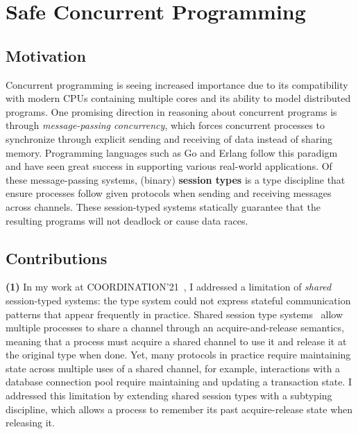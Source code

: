 \documentclass[11pt]{article}
\begin{document}
\section*{Safe Concurrent Programming}
\subsection*{Motivation}
Concurrent programming is seeing increased importance due to its
compatibility with modern CPUs containing multiple cores and its ability to model
distributed programs.
One promising direction in reasoning about concurrent programs is through \emph{message-passing concurrency}, which forces concurrent processes to synchronize through explicit sending and receiving of data instead of sharing memory.
Programming languages such as Go and Erlang follow this paradigm and have seen great success in supporting various real-world applications.
Of these message-passing systems, (binary) \textbf{session types} is a type discipline that ensure processes follow given protocols when sending and receiving messages across channels.
These session-typed systems statically guarantee that the resulting programs will not deadlock or cause data races.

\subsection*{Contributions}
\hspace{\parindent}\ignorespaces\textbf{(1)} In my work at COORDINATION'21~\cite{Sano21coordination}, I addressed a limitation of \emph{shared} session-typed systems: the type system could not express stateful communication patterns that appear frequently in practice.
Shared session type systems~\cite{Balzer17icfp} allow multiple processes to share a channel through an acquire-and-release semantics, meaning that a process must acquire a shared channel to use it and release it at the original type when done.
Yet, many protocols in practice require maintaining state across multiple uses of a shared channel, for example, interactions with a database connection pool require maintaining and updating a transaction state.
I addressed this limitation by extending shared session types with a subtyping discipline, which allows a process to remember its past acquire-release state when releasing it.
\end{document}
